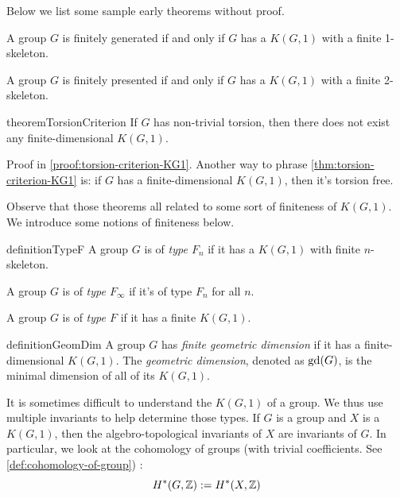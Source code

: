 Below we list some sample early theorems without proof.

\begin{theorem}
    \label{thm:fg-criterion-KG1}
    A group \(G\) is finitely generated if and only if \(G\) has a \(K(G,1)\) with a finite 1-skeleton.
\end{theorem}

\begin{theorem}
    \label{thm:fp-criterion-KG1}
     A group \(G\) is finitely presented if and only if \(G\) has a \(K(G,1)\) with a finite 2-skeleton.
\end{theorem}

\begin{restatable}{theorem}{TorsionCriterion}
    \label{thm:torsion-criterion-KG1}
    If \(G\) has non-trivial torsion, then there does not exist any finite-dimensional \(K(G,1)\). 
\end{restatable}
Proof in \cref{proof:torsion-criterion-KG1}.
Another way to phrase \cref{thm:torsion-criterion-KG1} is: if \(G\) has a finite-dimensional \(K(G,1)\), then it's torsion free.

Observe that those theorems all related to some sort of finiteness of \(K(G,1)\). We introduce some notions of finiteness below.

\begin{restatable}{definition}{TypeF}
    \label{def:finite-type-KG1}
    A group \(G\) is of \emph{type \(F_n\)} if it has a \(K(G,1)\) with finite \(n\)-skeleton.

    A group \(G\) is of \emph{type \(F_\infty\)} if it's of type \(F_n\) for all \(n\).
    
    A group \(G\) is of \emph{type \(F\)} if it has a finite \(K(G,1)\).
\end{restatable}

\begin{restatable}{definition}{GeomDim}
    \label{def:geometric-dimension}
      A group \(G\) has \emph{finite geometric dimension} if it has a finite-dimensional \(K(G,1)\). The \emph{geometric dimension}, denoted as \(\operatorname{gd}({G})\), is the minimal dimension of all of its \(K(G,1)\).     
\end{restatable}

It is sometimes difficult to understand the \(K(G,1)\) of a group. We thus use multiple invariants to help determine those types. If \(G\) is a group and \(X\) is a \(K(G,1)\), then the algebro-topological invariants of \(X\) are invariants of \(G\). In particular, we look at the cohomology of groups (with trivial coefficients. See \cref{def:cohomology-of-group}) :
\[ H^*(G,\mathbb{Z}):= H^*(X,\mathbb{Z}) \]